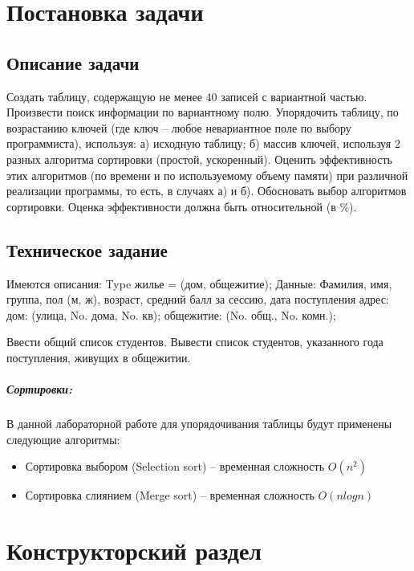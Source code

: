 \chapter{Постановка задачи}

\section{Описание задачи}

Создать таблицу, содержащую не менее 40 записей с вариантной частью. Произвести 
поиск  информации  по  вариантному  полю.  Упорядочить  таблицу,  по  возрастанию  ключей 
(где  ключ  –  любое  невариантное  поле  по  выбору  программиста),  используя:  а)  исходную 
таблицу;  б) массив  ключей, используя  2  разных  алгоритма сортировки  (простой, 
ускоренный).  Оценить  эффективность  этих  алгоритмов  (по  времени  и  по  используемому 
объему памяти) при различной реализации программы, то есть, в случаях а) и б). Обосновать 
выбор алгоритмов сортировки. Оценка эффективности должна быть относительной (в \%).

\section{Техническое задание}

Имеются описания: 
Type   жилье = (дом, общежитие); 
Данные:  
Фамилия, имя, группа, пол (м, ж), возраст, средний 
балл за сессию, дата поступления 
адрес:  
дом: (улица, No. дома, No. кв); 
общежитие: (No. общ., No. комн.); 

Ввести общий список студентов. 
Вывести список студентов, указанного года поступления, 
живущих в общежитии.

\paragraph{Сортировки: }

В данной лабораторной работе для упорядочивания таблицы будут применены следующие алгоритмы:

\begin{itemize}
	\item Сортировка выбором (Selection sort) -- временная сложность $O(n^2)$
	\item Сортировка слиянием (Merge sort) -- временная сложность $O(nlogn)$
\end{itemize}

\chapter{Конструкторский раздел}

